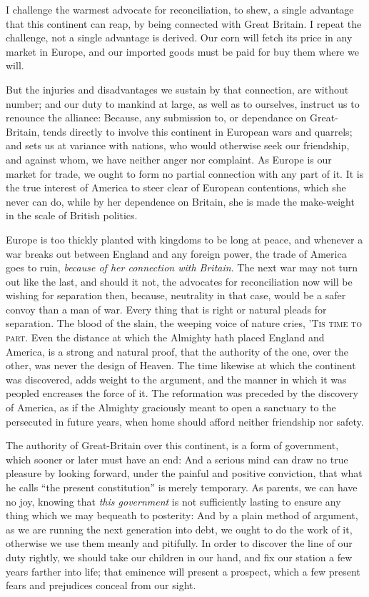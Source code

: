 \documentclass[12pt, twocolumn]{book}
\begin{document}
    I challenge the warmest advocate for reconciliation, to shew, a single advantage that this continent can reap, by being connected with Great Britain. I repeat the challenge, not a single advantage is derived. Our corn will fetch its price in any market in Europe, and our imported goods must be paid for buy them where we will.

    But the injuries and disadvantages we sustain by that connection, are without number; and our duty to mankind at large, as well as to ourselves, instruct us to renounce the alliance: Because, any submission to, or dependance on Great-Britain, tends directly to involve this continent in European wars and quarrels; and sets us at variance with nations, who would otherwise seek our friendship, and against whom, we have neither anger nor complaint. As Europe is our market for trade, we ought to form no partial connection with any part of it. It is the true interest of America to steer clear of European contentions, which she never can do, while by her dependence on Britain, she is made the make-weight in the scale of British politics.

    Europe is too thickly planted with kingdoms to be long at peace, and whenever a war breaks out between England and any foreign power, the trade of America goes to ruin, \textit{because of her connection with Britain}. The next war may not turn out like the last, and should it not, the advocates for reconciliation now will be wishing for separation then, because, neutrality in that case, would be a safer convoy than a man of war. Every thing that is right or natural pleads for separation. The blood of the slain, the weeping voice of nature cries, ’\textsc{Tis time to part}. Even the distance at which the Almighty hath placed England and America, is a strong and natural proof, that the authority of the one, over the other, was never the design of Heaven. The time likewise at which the continent was discovered, adds weight to the argument, and the manner in which it was peopled encreases the force of it. The reformation was preceded by the discovery of America, as if the Almighty graciously meant to open a sanctuary to the persecuted in future years, when home should afford neither friendship nor safety.

    The authority of Great-Britain over this continent, is a form of government, which sooner or later must have an end: And a serious mind can draw no true pleasure by looking forward, under the painful and positive conviction, that what he calls “the present constitution” is merely temporary. As parents, we can have no joy, knowing that \textit{this government} is not sufficiently lasting to ensure any thing which we may bequeath to posterity: And by a plain method of argument, as we are running the next generation into debt, we ought to do the work of it, otherwise we use them meanly and pitifully. In order to discover the line of our duty rightly, we should take our children in our hand, and fix our station a few years farther into life; that eminence will present a prospect, which a few present fears and prejudices conceal from our sight.
\end{document}
